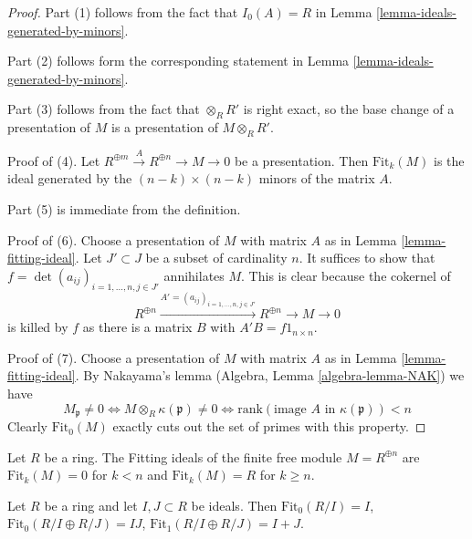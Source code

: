 \begin{proof}
Part (1) follows from the fact that $I_0(A) = R$ in
Lemma \ref{lemma-ideals-generated-by-minors}.

\medskip\noindent
Part (2) follows form the corresponding statement in
Lemma \ref{lemma-ideals-generated-by-minors}.

\medskip\noindent
Part (3) follows from the fact that $\otimes_R R'$ is right exact,
so the base change of a presentation of $M$ is a presentation of
$M \otimes_R R'$.

\medskip\noindent
Proof of (4). Let $R^{\oplus m} \xrightarrow{A} R^{\oplus n} \to M \to 0$
be a presentation. Then $\text{Fit}_k(M)$ is the ideal generated by the
$(n - k) \times (n - k)$ minors of the matrix $A$.

\medskip\noindent
Part (5) is immediate from the definition.

\medskip\noindent
Proof of (6). Choose a presentation of $M$ with matrix $A$
as in Lemma \ref{lemma-fitting-ideal}.
Let $J' \subset J$ be a subset of cardinality $n$.
It suffices to show that
$f = \det(a_{ij})_{i = 1, \ldots, n, j \in J'}$
annihilates $M$.
This is clear because the cokernel of
$$
R^{\oplus n} \xrightarrow{A' = (a_{ij})_{i = 1, \ldots, n, j \in J'}}
R^{\oplus n} \to M \to 0
$$
is killed by $f$ as there is a matrix $B$ with $A' B = f1_{n \times n}$.

\medskip\noindent
Proof of (7). Choose a presentation of $M$ with matrix $A$
as in Lemma \ref{lemma-fitting-ideal}.
By Nakayama's lemma (Algebra, Lemma \ref{algebra-lemma-NAK})
we have
$$
M_\mathfrak p \not = 0
\Leftrightarrow
M \otimes_R \kappa(\mathfrak p) \not = 0
\Leftrightarrow
\text{rank}(\text{image }A\text{ in }\kappa(\mathfrak p)) < n
$$
Clearly $\text{Fit}_0(M)$ exactly cuts out the set of primes
with this property.
\end{proof}

\begin{example}
\label{example-fitting-free}
Let $R$ be a ring.
The Fitting ideals of the finite free module $M = R^{\oplus n}$
are $\text{Fit}_k(M) = 0$ for $k < n$ and $\text{Fit}_k(M) = R$
for $k \geq n$.
\end{example}

\begin{example}
\label{example-laurent}
Let $R$ be a ring and let $I, J\subset R$ be ideals.
Then $\text{Fit}_0(R/I) = I$, $\text{Fit}_0(R/I \oplus R/J) = IJ$,
$\text{Fit}_1(R/I\oplus R/J) = I+J$.
\end{example}

